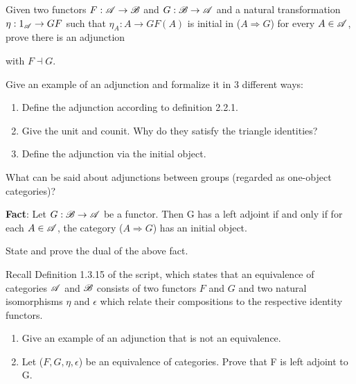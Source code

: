 \begin{exercise}
Given two functors $F: \operatorname{\mathscr A} \rightarrow \operatorname{\mathscr B}$ and $G: \operatorname{\mathscr B} \rightarrow \operatorname{\mathscr A}$ and a natural transformation $\eta: 1_{\operatorname{\mathscr A}} \rightarrow GF$ such that $\eta_A: A \rightarrow GF(A)$ is initial in ($A \Rightarrow G$) for every $A \in \operatorname{\mathscr A}$, prove there is an adjunction
with $F \dashv G$.
\end{exercise}

\begin{exercise}
Give an example of an adjunction and formalize it in 3 different ways:
\begin{enumerate}
\item Define the adjunction according to definition 2.2.1.
\item Give the unit and counit. Why do they satisfy the triangle identities?
\item Define the adjunction via the initial object.
\end{enumerate}
\end{exercise}


\begin{exercise}
What can be said about adjunctions between groups (regarded as one-object categories)?
\end{exercise}

\textbf{Fact}: Let $G: \operatorname{\mathscr B} \rightarrow \operatorname{\mathscr A}$ be a functor. Then G has a left adjoint if and only if for each $A \in \operatorname{\mathscr A}$, the category ($A \Rightarrow G$) has an initial object.\\

\begin{exercise}
State and prove the dual of the above fact.
\end{exercise}

\begin{exercise}
  Recall Definition 1.3.15 of the script, which states that an equivalence of categories $\operatorname{\mathscr A}$ and $\operatorname{\mathscr B}$ consists of two functors $F$ and $G$ and two natural isomorphisms $\eta$ and $\epsilon$ which relate their compositions to the respective identity functors.
\begin{enumerate}
\item Give an example of an adjunction that is not an equivalence.
\item Let ($F, G, \eta, \epsilon$) be an equivalence of categories. Prove that F is left adjoint to G.
\end{enumerate}
\end{exercise}


